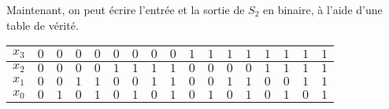 \documentclass{article}
\begin{document}
Maintenant, on peut écrire l'entrée et la sortie de $S_{2}$ en binaire, à l'aide d'une table de vérité.
\medbreak
\begin{center}
\begin{tabular}{|l|l|l|l|l|l|l|l|l|l|l|l|l|l|l|l|l|}
\hline
\multicolumn{1}{|l|}{$x_{3}$}&	\multicolumn{1}{|l|}{ $0$}&	\multicolumn{1}{|l|}{ $0$}&	\multicolumn{1}{|l|}{ $0$}&	\multicolumn{1}{|l|}{ $0$}&	\multicolumn{1}{|l|}{ $0$}&	\multicolumn{1}{|l|}{ $0$}&	\multicolumn{1}{|l|}{ $0$}&	\multicolumn{1}{|l|}{ $0$}&	\multicolumn{1}{|l|}{ $1$}&	\multicolumn{1}{|l|}{ $1$}&	\multicolumn{1}{|l|}{ $1$}&	\multicolumn{1}{|l|}{ $1$}&	\multicolumn{1}{|l|}{ $1$}&	\multicolumn{1}{|l|}{ $1$}&	\multicolumn{1}{|l|}{ $1$}&	\multicolumn{1}{|l|}{ $1$}	\\
\hline
\multicolumn{1}{|l|}{ $x_{2}$}&	\multicolumn{1}{|l|}{ $0$}&	\multicolumn{1}{|l|}{ $0$}&	\multicolumn{1}{|l|}{ $0$}&	\multicolumn{1}{|l|}{ $0$}&	\multicolumn{1}{|l|}{ $1$}&	\multicolumn{1}{|l|}{ $1$}&	\multicolumn{1}{|l|}{ $1$}&	\multicolumn{1}{|l|}{ $1$}&	\multicolumn{1}{|l|}{ $0$}&	\multicolumn{1}{|l|}{ $0$}&	\multicolumn{1}{|l|}{ $0$}&	\multicolumn{1}{|l|}{ $0$}&	\multicolumn{1}{|l|}{ $1$}&	\multicolumn{1}{|l|}{ $1$}&	\multicolumn{1}{|l|}{ $1$}&	\multicolumn{1}{|l|}{ $1$}	\\
\hline
\multicolumn{1}{|l|}{ $x_{1}$}&	\multicolumn{1}{|l|}{ $0$}&	\multicolumn{1}{|l|}{ $0$}&	\multicolumn{1}{|l|}{ $1$}&	\multicolumn{1}{|l|}{ $1$}&	\multicolumn{1}{|l|}{ $0$}&	\multicolumn{1}{|l|}{ $0$}&	\multicolumn{1}{|l|}{ $1$}&	\multicolumn{1}{|l|}{ $1$}&	\multicolumn{1}{|l|}{ $0$}&	\multicolumn{1}{|l|}{ $0$}&	\multicolumn{1}{|l|}{ $1$}&	\multicolumn{1}{|l|}{ $1$}&	\multicolumn{1}{|l|}{ $0$}&	\multicolumn{1}{|l|}{ $0$}&	\multicolumn{1}{|l|}{ $1$}&	\multicolumn{1}{|l|}{ $1$}	\\
\hline
\multicolumn{1}{|l|}{ $x_{0}$}&	\multicolumn{1}{|l|}{ $0$}&	\multicolumn{1}{|l|}{ $1$}&	\multicolumn{1}{|l|}{ $0$}&	\multicolumn{1}{|l|}{ $1$}&	\multicolumn{1}{|l|}{ $0$}&	\multicolumn{1}{|l|}{ $1$}&	\multicolumn{1}{|l|}{ $0$}&	\multicolumn{1}{|l|}{ $1$}&	\multicolumn{1}{|l|}{ $0$}&	\multicolumn{1}{|l|}{ $1$}&	\multicolumn{1}{|l|}{ $0$}&	\multicolumn{1}{|l|}{ $1$}&	\multicolumn{1}{|l|}{ $0$}&	\multicolumn{1}{|l|}{ $1$}&	\multicolumn{1}{|l|}{ $0$}&	\multicolumn{1}{|l|}{ $1$}	\\
\hline
\end{tabular}

\smallskip


\end{center}
\end{document}
